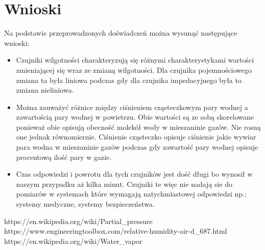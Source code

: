 \documentclass[11pt]{article}
\begin{document}
    \section{Wnioski}
    \par Na podstawie przeprowadzonych doświadczeń można wysunąć następujące wnioski:
    \begin{itemize}
        \item Czujniki wilgotności charakteryzują się różnymi charakterystykami wartości zmieniającej się wraz ze zmianą wilgotności. Dla czujnika
        pojemnościowego zmiana ta była liniowa podczas gdy dla czujnika impedacyjnego była to zmiana nieliniowa.
        \item Można zauważyć różnice między ciśnieniem cząsteczkowym pary wodnej a zawartością pary wodnej w powietrzu. Obie wartości są ze sobą
        skorelowane ponieważ obie opisują obecność molekół wody w mieszaninie gazów. Nie rosną one jednak równomiernie. Ciśnienie cząsteczko opisuje
        ciśnienie jakie wywiar para wodna w mieszaninie gazów podczas gdy zawartość pary wodnej opisuje procentową ilość pary w gazie.
        \item Czas odpowiedzi i powrotu dla tych czujników jest dość długi bo wynosił w naszym przypadku aż kilka minut. Czujniki te więc nie nadają sie
        do pomiarów w systemach które wymagają natychmiastowej odpowiedzi np.: systemy medyczne, systemy bezpieczeństwa.
    \end{itemize}




    \vfill
    \footnotesize
    \begin{thebibliography}{3}
        https://en.wikipedia.org/wiki/Partial\_pressure
        https://www.engineeringtoolbox.com/relative-humidity-air-d\_687.html
        https://en.wikipedia.org/wiki/Water\_vapor
    \end{thebibliography}
\end{document}
